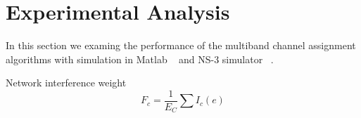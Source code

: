 \section{Experimental Analysis}
\label{sec:experimentdesign}

In this section we examing the performance of the multiband channel assignment algorithms with simulation in Matlab ~\cite{matlab} and NS-3 simulator ~\cite{NS3}. 

Network interference weight
\begin{equation}
F_c=\frac{1}{E_C}\sum{I_c(e)}
\end{equation}











